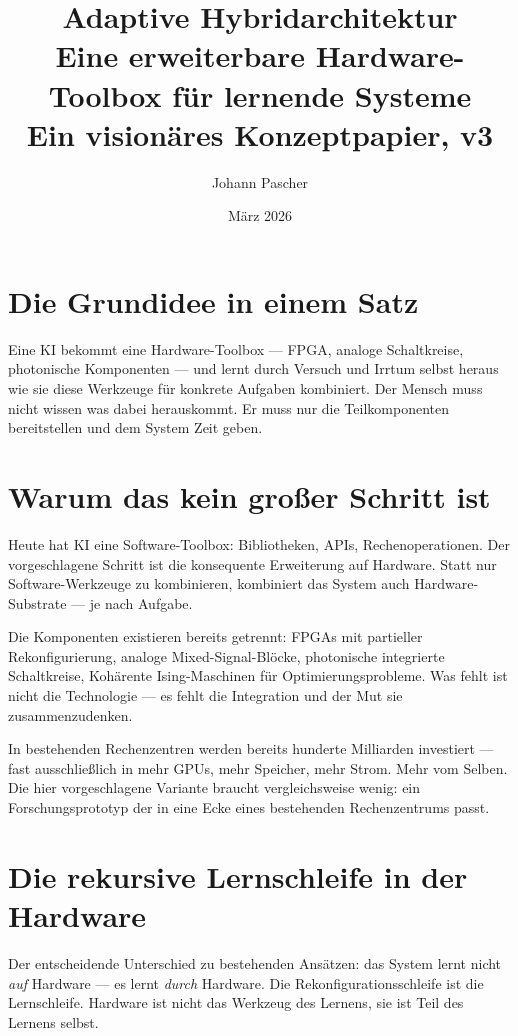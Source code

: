 \documentclass[a4paper,12pt]{article}
\title{\textbf{Adaptive Hybridarchitektur}\\
\large Eine erweiterbare Hardware-Toolbox für lernende Systeme\\
\normalsize Ein visionäres Konzeptpapier, v3}
\author{Johann Pascher}
\date{März 2026}
\begin{document}
\maketitle

\section{Die Grundidee in einem Satz}

Eine KI bekommt eine Hardware-Toolbox --- FPGA, analoge Schaltkreise, photonische Komponenten --- und lernt durch Versuch und Irrtum selbst heraus wie sie diese Werkzeuge für konkrete Aufgaben kombiniert. Der Mensch muss nicht wissen was dabei herauskommt. Er muss nur die Teilkomponenten bereitstellen und dem System Zeit geben.

\section{Warum das kein großer Schritt ist}

Heute hat KI eine Software-Toolbox: Bibliotheken, APIs, Rechenoperationen. Der vorgeschlagene Schritt ist die konsequente Erweiterung auf Hardware. Statt nur Software-Werkzeuge zu kombinieren, kombiniert das System auch Hardware-Substrate --- je nach Aufgabe.

Die Komponenten existieren bereits getrennt: FPGAs mit partieller Rekonfigurierung, analoge Mixed-Signal-Blöcke, photonische integrierte Schaltkreise, Kohärente Ising-Maschinen für Optimierungsprobleme. Was fehlt ist nicht die Technologie --- es fehlt die Integration und der Mut sie zusammenzudenken.

In bestehenden Rechenzentren werden bereits hunderte Milliarden investiert --- fast ausschließlich in mehr GPUs, mehr Speicher, mehr Strom. Mehr vom Selben. Die hier vorgeschlagene Variante braucht vergleichsweise wenig: ein Forschungsprototyp der in eine Ecke eines bestehenden Rechenzentrums passt.

\section{Die rekursive Lernschleife in der Hardware}

Der entscheidende Unterschied zu bestehenden Ansätzen: das System lernt nicht \textit{auf} Hardware --- es lernt \textit{durch} Hardware. Die Rekonfigurationsschleife ist die Lernschleife. Hardware ist nicht das Werkzeug des Lernens, sie ist Teil des Lernens selbst.
\end{document}
